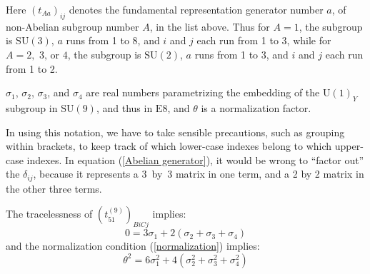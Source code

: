 \documentclass[a4paper,12pt,oneside]{article}
\begin{document}
Here $\left(t_{Aa}\right)_{ij}$ denotes the fundamental 
representation generator number $a$, of non-Abelian subgroup number 
$A$, in the list above.  Thus for $A=1$, the subgroup is 
$\mathrm{SU}(3)$, $a$ runs from 1 to 8, and $i$ and $j$ each run
from 1 to 3, while for $A=2,\textrm{ 3, or 4}$, the subgroup is
$\mathrm{SU}(2)$, $a$ runs from 1 to 3, and $i$ and $j$ each run
from 1 to 2.

$\sigma_1$, $\sigma_2$, $\sigma_3$, and $\sigma_4$ are real numbers
parametrizing the embedding of the $\mathrm{U}(1)_Y$ subgroup in
$\mathrm{SU}(9)$, and thus in $\mathrm{E}8$, and $\theta$ is a
normalization factor.

In using this notation, we have to take sensible precautions, such
as grouping within brackets, to keep track of which lower-case 
indexes belong to which upper-case indexes.  In equation
(\ref{Abelian generator}), it would be wrong to ``factor out'' the
$\delta_{ij}$, because it represents a \mbox{3 by 3} matrix in one
term, and a 2 by 2 matrix in the other three terms.

The tracelessness of $\left(t_{51}^{(9)}\right)_{BiCj}$ implies:
\begin{equation}\label{tracelessness}
0 = 3\sigma_1+2\left(\sigma_2+\sigma_3+\sigma_4\right)
\end{equation}
and the normalization condition (\ref{normalization}) implies:
\begin{equation}\label{theta squared}
\theta^2 = 
6\sigma_1^2+4\left(\sigma_2^2+\sigma_3^2+\sigma_4^2\right)
\end{equation}
\end{document}
